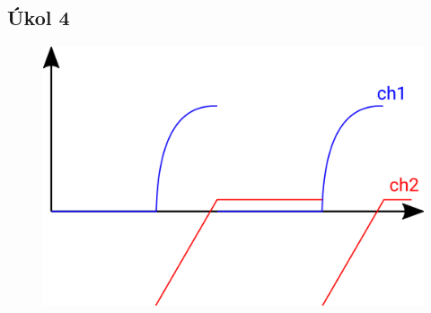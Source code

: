 \documentclass[5pt]{article}
\begin{document}
\subsection{Úkol 4}
\begin{figure}[htp]
\centering
\includegraphics[scale=0.35]{graph.png}
\caption{}
\label{}
\end{figure}
\end{document}
